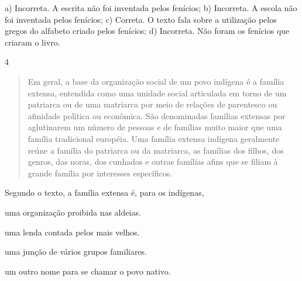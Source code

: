\begin{itemize}
\begin{itemize}
\begin{itemize}
\begin{itemize}
{{\begin{itemize}
\begin{itemize}
{a) Incorreta. A escrita não foi inventada pelos fenícios;
b) Incorreta. A escola não foi inventada pelos fenícios;
c) Correta. O texto fala sobre a utilização pelos gregos do alfabeto
criado pelos fenícios;
d) Incorreta. Não foram os fenícios que criaram o livro.}

\num{4}

\begin{quote}
Em geral, a base da organização social de um povo indígena é a
família extensa, entendida como uma unidade social articulada em torno
de um patriarca ou de uma matriarca por meio de relações de parentesco
ou afinidade política ou econômica. São denominadas famílias extensas
por aglutinarem um número de pessoas e de famílias muito maior que uma
família tradicional européia. Uma família extensa indígena geralmente
reúne a família do patriarca ou da matriarca, as famílias dos filhos,
dos genros, das noras, dos cunhados e outras famílias afins que se
filiam à grande família por interesses específicos.

\end{quote}

Segundo o texto, a família extensa é, para os indígenas,

\begin{escolha}
\item uma organização proibida nas aldeias.

\item uma lenda contada pelos mais velhos.

\item uma junção de vários grupos familiares.

\item um outro nome para se chamar o povo nativo.
\end{escolha}



\end{itemize}
\end{itemize}}}
\end{itemize}
\end{itemize}
\end{itemize}
\end{itemize}
